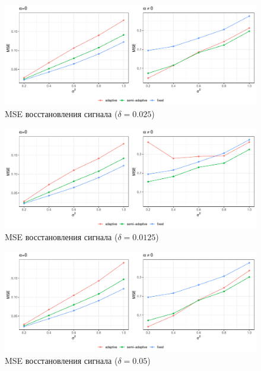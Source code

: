 \documentclass{math-mech-sci}
\begin{document}
\begin{figure}[!h]
    \centering
    \includegraphics[width=\linewidth]{img/mse.pdf}
    \caption{MSE восстановления сигнала ($\delta=0.025$)}
    \label{fig:mse1}
\end{figure}
\begin{figure}[h!]
    \centering
    \includegraphics[width=\linewidth]{img/mse_delta_smaller.pdf}
    \caption{MSE восстановления сигнала ($\delta=0.0125$)}
    \label{fig:mse2}
\end{figure}
\begin{figure}[h!]
    \centering
    \includegraphics[width=\linewidth]{img/mse_delta_bigger.pdf}
    \caption{MSE восстановления сигнала ($\delta=0.05$)}
    \label{fig:mse3}
\end{figure}
\end{document}
